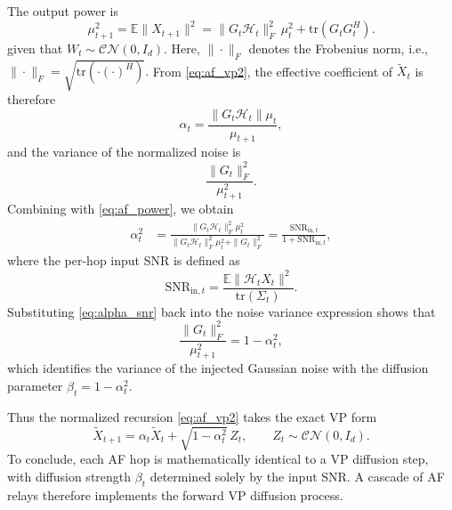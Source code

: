 \documentclass[journal]{IEEEtran}
\begin{document}
The output power is
\begin{equation}
    \mu_{t+1}^2 = \mathbb{E}\|X_{t+1}\|^2 
    = \|G_t \mathcal{H}_t\|_F^2\,\mu_t^2 + \mathrm{tr}(G_t G_t^{\!H}).
    \label{eq:af_power}
\end{equation}
given that $W_t\sim\mathcal{CN}(0,I_d)$. Here, $\|\cdot\|_F$ denotes the Frobenius norm, i.e.,
$
\|\cdot\|_F = \sqrt{\mathrm{tr}(\cdot (\cdot)^{\!H})}.
$ From \eqref{eq:af_vp2}, the effective coefficient of $\tilde{X}_t$ is therefore
\begin{equation}
    \alpha_t = \frac{\|G_t \mathcal{H}_t\|\mu_t}{\mu_{t+1}},
\end{equation}
and the variance of the normalized noise is
\begin{equation}
    \frac{\|G_t\|_F^2}{\mu_{t+1}^2}.
\end{equation}
Combining with \eqref{eq:af_power}, we obtain
\begin{align}
    \alpha_t^2 
    &= \frac{\|G_t \mathcal{H}_t\|_F^2 \mu_t^2}{\|G_t \mathcal{H}_t\|_F^2 \mu_t^2 + \|G_t\|_F^2} 
     = \frac{\mathrm{SNR}_{\mathrm{in},t}}{1+\mathrm{SNR}_{\mathrm{in},t}}, \label{eq:alpha_snr}
\end{align}
where the per-hop input SNR is defined as
\begin{equation}
    \mathrm{SNR}_{\mathrm{in},t} 
    = \frac{\mathbb{E}\|\mathcal{H}_t X_t\|^2}{\mathrm{tr}(\Sigma_t)}.
\end{equation}
Substituting \eqref{eq:alpha_snr} back into the noise variance expression shows that
\begin{equation}
    \frac{\|G_t\|_F^2}{\mu_{t+1}^2} = 1-\alpha_t^2,
\end{equation}
which identifies the variance of the injected Gaussian noise with the diffusion parameter $\beta_t=1-\alpha_t^2$. 

Thus the normalized recursion \eqref{eq:af_vp2} takes the exact VP form
\begin{equation}
    \tilde{X}_{t+1} = \alpha_t \tilde{X}_t + \sqrt{1-\alpha_t^2}\,Z_t,
    \qquad Z_t\sim\mathcal{CN}(0,I_d).
\end{equation}
To conclude, each AF hop is mathematically identical to a VP diffusion step, with diffusion strength $\beta_t$ determined solely by the input SNR. A cascade of AF relays therefore implements the forward VP diffusion process.
\end{document}
